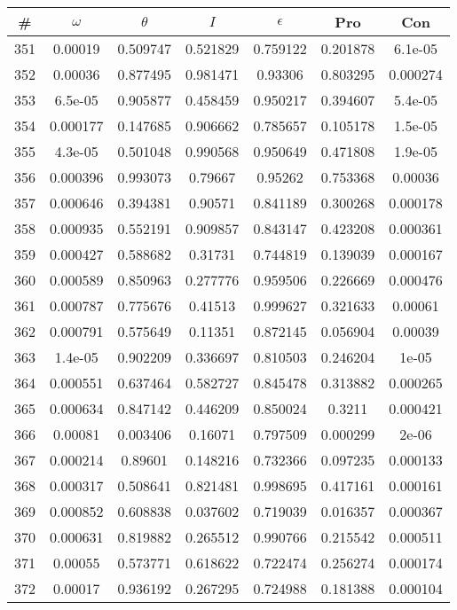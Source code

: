 \newpage
\begin{table}
\begin{tabular}{c|c|c|c|c|c|c}
\# & $\omega$ & $\theta$ & $I$ & $\epsilon$ & Pro & Con\\
\hline
351 & 0.00019 & 0.509747 & 0.521829 & 0.759122 & 0.201878 & 6.1e-05\\
352 & 0.00036 & 0.877495 & 0.981471 & 0.93306 & 0.803295 & 0.000274\\
353 & 6.5e-05 & 0.905877 & 0.458459 & 0.950217 & 0.394607 & 5.4e-05\\
354 & 0.000177 & 0.147685 & 0.906662 & 0.785657 & 0.105178 & 1.5e-05\\
355 & 4.3e-05 & 0.501048 & 0.990568 & 0.950649 & 0.471808 & 1.9e-05\\
356 & 0.000396 & 0.993073 & 0.79667 & 0.95262 & 0.753368 & 0.00036\\
357 & 0.000646 & 0.394381 & 0.90571 & 0.841189 & 0.300268 & 0.000178\\
358 & 0.000935 & 0.552191 & 0.909857 & 0.843147 & 0.423208 & 0.000361\\
359 & 0.000427 & 0.588682 & 0.31731 & 0.744819 & 0.139039 & 0.000167\\
360 & 0.000589 & 0.850963 & 0.277776 & 0.959506 & 0.226669 & 0.000476\\
361 & 0.000787 & 0.775676 & 0.41513 & 0.999627 & 0.321633 & 0.00061\\
362 & 0.000791 & 0.575649 & 0.11351 & 0.872145 & 0.056904 & 0.00039\\
363 & 1.4e-05 & 0.902209 & 0.336697 & 0.810503 & 0.246204 & 1e-05\\
364 & 0.000551 & 0.637464 & 0.582727 & 0.845478 & 0.313882 & 0.000265\\
365 & 0.000634 & 0.847142 & 0.446209 & 0.850024 & 0.3211 & 0.000421\\
366 & 0.00081 & 0.003406 & 0.16071 & 0.797509 & 0.000299 & 2e-06\\
367 & 0.000214 & 0.89601 & 0.148216 & 0.732366 & 0.097235 & 0.000133\\
368 & 0.000317 & 0.508641 & 0.821481 & 0.998695 & 0.417161 & 0.000161\\
369 & 0.000852 & 0.608838 & 0.037602 & 0.719039 & 0.016357 & 0.000367\\
370 & 0.000631 & 0.819882 & 0.265512 & 0.990766 & 0.215542 & 0.000511\\
371 & 0.00055 & 0.573771 & 0.618622 & 0.722474 & 0.256274 & 0.000174\\
372 & 0.00017 & 0.936192 & 0.267295 & 0.724988 & 0.181388 & 0.000104\\

\end{tabular}
\end{table}
